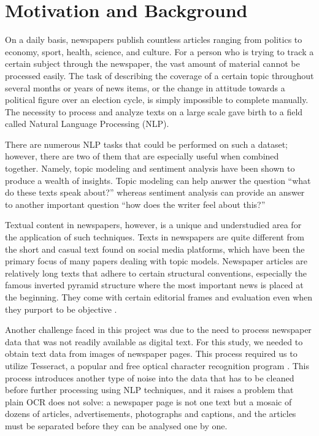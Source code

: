 \section{Motivation and Background}

On a daily basis, newspapers publish countless articles ranging from politics to economy, sport, health, science, and culture. For a person who is trying to track a certain subject through the newspaper, the vast amount of material cannot be processed easily. The task of describing the coverage of a certain topic throughout several months or years of news items, or the change in attitude towards a political figure over an election cycle, is simply impossible to complete manually. The necessity to process and analyze texts on a large scale gave birth to a field called Natural Language Processing (NLP).

There are numerous NLP tasks that could be performed on such a dataset; however, there are two of them that are especially useful when combined together. Namely, topic modeling and sentiment analysis have been shown to produce a wealth of insights. Topic modeling can help answer the question ``what do these texts speak about?'' whereas sentiment analysis can provide an answer to another important question ``how does the writer feel about this?''

Textual content in newspapers, however, is a unique and understudied area for the application of such techniques. Texts in newspapers are quite different from the short and casual text found on social media platforms, which have been the primary focus of many papers dealing with topic models. Newspaper articles are relatively long texts that adhere to certain structural conventions, especially the famous inverted pyramid structure where the most important news is placed at the beginning. They come with certain editorial frames and evaluation even when they purport to be objective \cite{entman1993}.

Another challenge faced in this project was due to the need to process newspaper data that was not readily available as digital text. For this study, we needed to obtain text data from images of newspaper pages. This process required us to utilize Tesseract, a popular and free optical character recognition program \cite{smith2007}. This process introduces another type of noise into the data that has to be cleaned before further processing using NLP techniques, and it raises a problem that plain OCR does not solve: a newspaper page is not one text but a mosaic of dozens of articles, advertisements, photographs and captions, and the articles must be separated before they can be analysed one by one.

